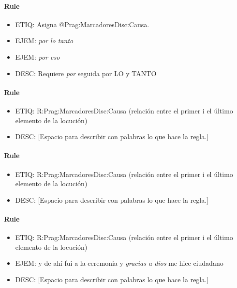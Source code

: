\documentclass[11pt]{report}
\begin{document}
\paragraph*{Rule}
\begin{itemize}
\item ETIQ: Asigna @Prag:MarcadoresDisc:Causa.
\item EJEM: \emph{por lo tanto}
\item EJEM: \emph{por eso}
\item DESC: Requiere \emph{por} seguida por LO y TANTO
\end{itemize}

\paragraph*{Rule}
\begin{itemize}
\item ETIQ: R:Prag:MarcadoresDisc:Causa (relación entre el primer i el último elemento de la locución)
\item DESC: [Espacio para describir con palabras lo que hace la regla.]
\end{itemize}

\paragraph*{Rule}
\begin{itemize}
\item ETIQ: R:Prag:MarcadoresDisc:Causa (relación entre el primer i el último elemento de la locución)
\item DESC: [Espacio para describir con palabras lo que hace la regla.]
\end{itemize}

\paragraph*{Rule}
\begin{itemize}
\item ETIQ: R:Prag:MarcadoresDisc:Causa (relación entre el primer i el último elemento de la locución)
\item EJEM: y de ahí fui a la ceremonia y \emph{gracias a dios} me hice ciudadano
\item DESC: [Espacio para describir con palabras lo que hace la regla.]
\end{itemize}
\end{document}
